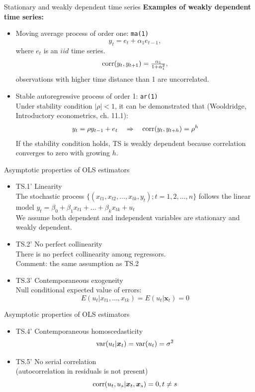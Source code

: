 \documentclass{beamer}
\begin{document}
\begin{frame}{Stationary and weakly dependent time series}
\textbf{Examples of weakly dependent time series:}
\bigskip
\begin{itemize}
\item Moving average process of order one: \texttt{ma(1)}
$$y_t=e_t+\alpha_1 e_{t-1},$$
where $e_t$ is an $\textit{iid}$ time series.\\ $$\textnormal{corr}(y_t,y_{t+1})=\tfrac{\alpha_1}{1+\alpha_1^2},$$ observations with higher time distance than 1 are uncorrelated.
\bigskip
\item Stable autoregressive process of order 1: \texttt{ar(1)}\\
\medskip
Under stability condition $|\rho|<1$, it can be demonstrated that (Wooldridge, Introductory econometrics, ch. 11.1):
$$y_t=\rho y_{t-1} + e_t \quad \Rightarrow \quad \textnormal{corr}(y_t,y_{t+h})=\rho^h$$
If the stability condition holds, TS is weakly dependent because correlation converges  to zero with growing $h$.
\end{itemize}
\end{frame}
\begin{frame}{Asymptotic properties of OLS estimators}
\begin{itemize}
\item TS.1' Linearity \\The stochastic process 
$\{(x_{t1},x_{t2},\dots,x_{tk},y_t);t=1,2,\dots, n\}$ follows the linear model $ y_t = \beta_0 + \beta_1 x_{t1} + \dots + \beta_k x_{tk}+u_t$ 
\\ \vspace{0.1cm} We assume both dependent and independent variables are stationary and weakly dependent.
\medskip
\item TS.2' No perfect collinearity \\
There is no perfect collinearity among regressors. \\
{\footnotesize Comment: the same assumption as TS.2}
\medskip
\item TS.3' Contemporaneous exogeneity 
\\Null conditional expected value of errors: 
$$E(u_t|x_{t1},\dots,x_{tk})=E(u_t|\boldsymbol{x}_t)=0$$
\end{itemize}
\end{frame}
\begin{frame}{Asymptotic properties of OLS estimators}
\begin{itemize}
\item TS.4' Contemporaneous homoscedasticity
$$\textnormal{var}(u_t|\boldsymbol{x}_t)=\textnormal{var}(u_t)=\sigma^2$$
\vspace{0.5cm}
\item TS.5' No serial correlation \\(autocorrelation in residuals is not present)
$$\textnormal{corr}(u_t,u_s|\boldsymbol{x}_t,\boldsymbol{x}_s ) = 0, t\neq s$$
\end{itemize}
\end{frame}
\end{document}
